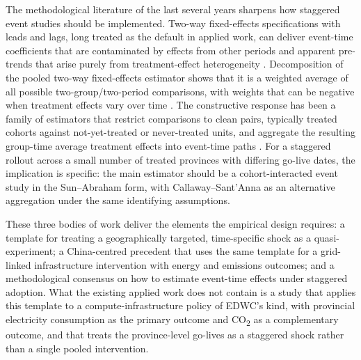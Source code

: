 \documentclass[12pt,a4paper]{article}
\begin{document}
The methodological literature of the last several years sharpens how
staggered event studies should be implemented. Two-way fixed-effects
specifications with leads and lags, long treated as the default in
applied work, can deliver event-time coefficients that are
contaminated by effects from other periods and apparent pre-trends
that arise purely from treatment-effect heterogeneity
\citep{sunabraham-2021-estimatingdynamictreatmenta}. Decomposition of
the pooled two-way fixed-effects estimator shows that it is a weighted
average of all possible two-group/two-period comparisons, with
weights that can be negative when treatment effects vary over time
\citep{goodman-bacon-2021-differenceindifferencesvariationtreatmenta,
dechaisemartindhaultfoeuille-2020-twowayfixedeffects}. The constructive
response has been a family of estimators that restrict comparisons to
clean pairs, typically treated cohorts against not-yet-treated or
never-treated units, and aggregate the resulting group-time average
treatment effects into event-time paths
\citep{callawaysantanna-2021-differenceindifferencesmultipletimea}.
For a staggered rollout across a small number of treated provinces
with differing go-live dates, the implication is specific: the main
estimator should be a cohort-interacted event study in the
Sun--Abraham form, with Callaway--Sant'Anna as an alternative
aggregation under the same identifying assumptions.

These three bodies of work deliver the elements the empirical design
requires: a template for treating a geographically targeted,
time-specific shock as a quasi-experiment; a China-centred precedent
that uses the same template for a grid-linked infrastructure
intervention with energy and emissions outcomes; and a
methodological consensus on how to estimate event-time effects under
staggered adoption. What the existing applied work does not contain
is a study that applies this template to a compute-infrastructure
policy of EDWC's kind, with provincial electricity consumption as
the primary outcome and CO\textsubscript{2} as a complementary
outcome, and that treats the province-level go-lives as a staggered
shock rather than a single pooled intervention.


\end{document}
